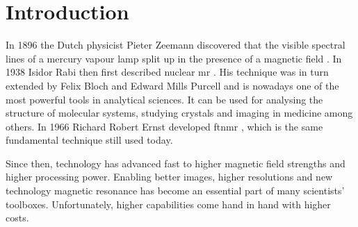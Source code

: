 \chapter{Introduction}


In 1896 the Dutch physicist Pieter Zeemann discovered that the visible spectral lines of a mercury vapour lamp split up in the presence of a magnetic field . In 1938 Isidor Rabi then first described nuclear \acrfull{mr} . His technique was in turn extended by Felix Bloch  and Edward Mills Purcell  and is nowadays one of the most powerful tools in analytical sciences. It can be used for analysing the structure of molecular systems, studying crystals and imaging in medicine among others. In 1966 Richard Robert Ernst developed \acrfull{ftnmr} , which is the same fundamental technique still used today.

Since then, technology has advanced fast to higher magnetic field strengths and higher processing power. Enabling better images, higher resolutions and new technology magnetic resonance has become an essential part of many scientists' toolboxes. Unfortunately, higher capabilities come hand in hand with higher costs.

